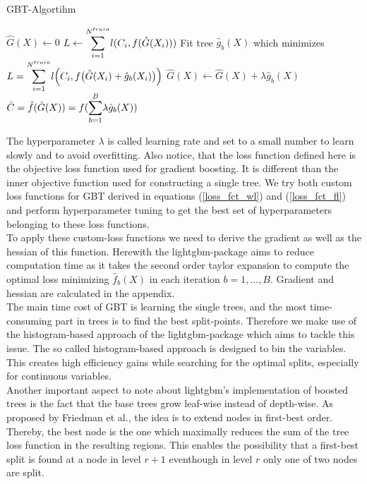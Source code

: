 \documentclass[12pt,titlepage]{article}
\begin{document}
\begin{algorithm}
\caption{GBT-Algortihm}\label{alg:boostedtrees}
\begin{algorithmic}
    \State $\hat{G}(X) \gets 0$
    \State $L \gets \mathlarger{\sum}_{i=1}^{N^{train}} l(C_{i}, f(\hat{G}(X_{i})))$
        \State Fit tree $\hat{g}_{b}(X)$ which minimizes $L = \mathlarger{\sum}_{i=1}^{N^{train}} l\Big(C_{i}, f\big(\hat{G}(X_{i}) + \hat{g}_{b}(X_{i})\big)\Big)$
        \State $\hat{G}(X) \gets \hat{G}(X) + \lambda\hat{g}_{b}(X)$
    \EndFor
    \State $\hat{C} = \hat{f}(\hat{G}(X)) = f(\mathlarger{\sum}_{b=1}^{B}\lambda\hat{g}_{b}(X))$
\end{algorithmic}
\end{algorithm}
\vspace{3mm}
\noindent
The hyperparameter $\lambda$ is called learning rate and set to a small number to learn slowly and to avoid overfitting. Also notice, that the loss function defined here is the objective loss function used for gradient boosting. It is different than the inner objective function used for constructing a single tree. We try both custom loss functions for GBT derived in equations (\ref{loss_fct_wl}) and (\ref{loss_fct_fl}) and perform hyperparameter tuning to get the best set of hyperparameters belonging to these loss functions. \\
To apply these custom-loss functions we need to derive the gradient as well as the hessian of this function. Herewith the lightgbm-package \cite{gbt} aims to reduce computation time as it takes the second order taylor expansion to compute the optimal loss minimizing $\hat{f}_{b}(X)$ in each iteration $b=1,...,B$. Gradient and hessian are calculated in the appendix. \\
The main time cost of GBT is learning the single trees, and the most time-consuming part in trees is to find the best split-points. Therefore we make use of the histogram-based approach of the lightgbm-package which aims to tackle this issue. The so called histogram-based approach is designed to bin the variables. This creates high efficiency gains while searching for the optimal splits, especially for continuous variables. \\
Another important aspect to note about lightgbm's implementation of boosted trees is the fact that the base trees grow leaf-wise instead of depth-wise. As proposed by Friedman et al., the idea is to extend nodes in first-best order. Thereby, the best node is the one which maximally reduces the sum of the tree loss function in the resulting regions. This enables the possibility that a first-best split is found at a node in level $r+1$ eventhough in level $r$ only one of two nodes are split. \\
\end{document}

